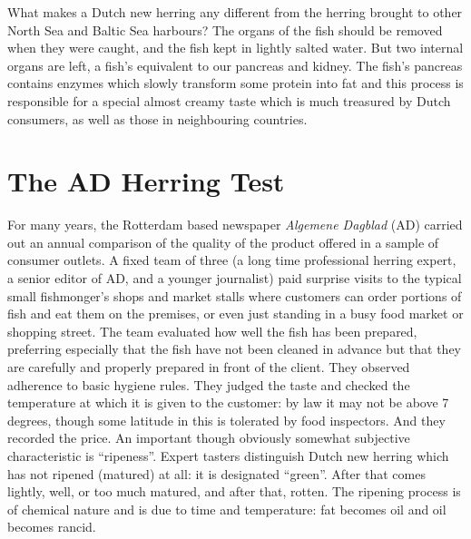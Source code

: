 \documentclass[alpha-refs]{wiley-article}
\begin{document}
What makes a Dutch new herring any different from the herring brought to other North Sea and Baltic Sea harbours? The organs of the fish should be removed when they were caught, and the fish kept in lightly salted water. But two internal organs are left, a fish's equivalent to our pancreas and kidney. The fish's pancreas contains enzymes which slowly transform some protein into fat and this process is responsible for a special almost creamy taste which is much treasured by Dutch consumers, as well as those in neighbouring countries. 



\section{The AD Herring Test}\label{adherringtest}


For many years, the Rotterdam based newspaper \emph{Algemene Dagblad} (AD) carried out an annual comparison of the quality of the product offered in a sample of consumer outlets. A fixed team of three (a long time professional herring expert, a senior editor of AD, and a younger journalist) paid surprise visits to the typical small fishmonger's shops and market stalls where customers can order portions of fish and eat them on the premises, or even just standing in a busy food market or shopping street. 
The team evaluated how well the fish has been prepared, preferring especially that the fish have not been cleaned in advance but that they are carefully and properly prepared in front of the client. They observed adherence to basic hygiene rules. They judged the taste and checked the temperature at which it is given to the customer: by law it may not be above 7 degrees, though some latitude in this is tolerated by food inspectors. And they recorded the price. An important though obviously somewhat subjective characteristic is ``ripeness''. Expert tasters distinguish Dutch new herring which has not ripened (matured) at all: it is designated ``green''. After that comes lightly, well, or too much matured, and after that, rotten. The ripening process is of chemical nature and is due to time and temperature: fat becomes oil and oil becomes rancid. 
\end{document}
